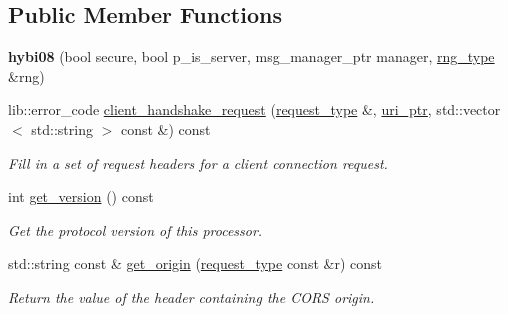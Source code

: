 \subsection*{Public Member Functions}
\begin{DoxyCompactItemize}
\item 
{\bfseries hybi08} (bool secure, bool p\+\_\+is\+\_\+server, msg\+\_\+manager\+\_\+ptr manager, \hyperlink{classwebsocketpp_1_1random_1_1none_1_1int__generator}{rng\+\_\+type} \&rng)\hypertarget{classwebsocketpp_1_1processor_1_1hybi08_aee51a54933474952a77d7dbe8ce1e06b}{}\label{classwebsocketpp_1_1processor_1_1hybi08_aee51a54933474952a77d7dbe8ce1e06b}

\item 
lib\+::error\+\_\+code \hyperlink{classwebsocketpp_1_1processor_1_1hybi08_a9509cba08ab3a15ea2ff34276b2582cb}{client\+\_\+handshake\+\_\+request} (\hyperlink{classwebsocketpp_1_1http_1_1parser_1_1request}{request\+\_\+type} \&, \hyperlink{namespacewebsocketpp_aae370ea5ac83a8ece7712cb39fc23f5b}{uri\+\_\+ptr}, std\+::vector$<$ std\+::string $>$ const \&) const
\begin{DoxyCompactList}\small\item\em Fill in a set of request headers for a client connection request. \end{DoxyCompactList}\item 
int \hyperlink{classwebsocketpp_1_1processor_1_1hybi08_aec4ce6245dbbd2532513a0f9704e4d7a}{get\+\_\+version} () const\hypertarget{classwebsocketpp_1_1processor_1_1hybi08_aec4ce6245dbbd2532513a0f9704e4d7a}{}\label{classwebsocketpp_1_1processor_1_1hybi08_aec4ce6245dbbd2532513a0f9704e4d7a}

\begin{DoxyCompactList}\small\item\em Get the protocol version of this processor. \end{DoxyCompactList}\item 
std\+::string const  \& \hyperlink{classwebsocketpp_1_1processor_1_1hybi08_a9d1844d9fc422723461c14e3f4d63faa}{get\+\_\+origin} (\hyperlink{classwebsocketpp_1_1http_1_1parser_1_1request}{request\+\_\+type} const \&r) const\hypertarget{classwebsocketpp_1_1processor_1_1hybi08_a9d1844d9fc422723461c14e3f4d63faa}{}\label{classwebsocketpp_1_1processor_1_1hybi08_a9d1844d9fc422723461c14e3f4d63faa}

\begin{DoxyCompactList}\small\item\em Return the value of the header containing the C\+O\+RS origin. \end{DoxyCompactList}\end{DoxyCompactItemize}

